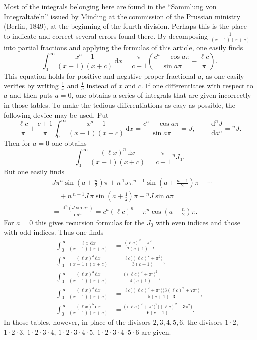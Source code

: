 \documentclass[11pt]{article}
\newcommand{\dd}{\,\mathrm d}
\begin{document}
Most of the integrals belonging here are found in the “Sammlung von Integraltafeln” issued by Minding at the commission of the Prussian ministry (Berlin, 1849), at the beginning of the fourth division. Perhaps this is the place to indicate and correct several errors found there. By decomposing $\frac1{(x-1)(x+c)}$ into partial fractions and applying the formulas of this article, one easily finds
\[
\int_0^\infty\frac{x^a-1}{(x-1)(x+c)}\dd x
=\frac{\pi}{c+1}
\left(\frac{c^a-\cos a\pi}{\sin a\pi}
-\frac{\ell c}{\pi}\right).
\]
This equation holds for positive and negative proper fractional $a$, as one easily verifies by writing $\frac1x$ and $\frac1c$ instead of $x$ and $c$. If one differentiates with respect to $a$ and then puts $a=0$, one obtains a series of integrals that are given incorrectly in those tables. To make the tedious differentiations as easy as possible, the following device may be used. Put
\[
\frac{\ell c}{\pi}+\frac{c+1}{\pi}
\int_0^\infty\frac{x^a-1}{(x-1)(x+c)}\dd x
=\frac{c^a-\cos a\pi}{\sin a\pi}=J,
\qquad
\frac{\dd^nJ}{\dd a^n}={}^{n}J.
\]
Then for $a=0$ one obtains
\[
\int_0^\infty\frac{(\ell x)^n\dd x}{(x-1)(x+c)}
=\frac{\pi}{c+1}\,{}^{n}J_0.
\]
But one easily finds
\[
\begin{aligned}
&J\pi^n\sin\left(a+\frac n2\right)\pi
+n\,{}^{1}J\,\pi^{n-1}\sin\left(a+\frac{n-1}{2}\right)\pi+\cdots\\
&\quad{}+n\,{}^{n-1}J\,\pi\sin\left(a+\frac12\right)\pi
+{}^{n}J\sin a\pi\\
&=\frac{\dd^n(J\sin a\pi)}{\dd a^n}
=c^a(\ell c)^n-\pi^n\cos\left(a+\frac n2\right)\pi.
\end{aligned}
\]
For $a=0$ this gives recursion formulas for the $J_0$ with even indices and those with odd indices. Thus one finds
\[
\begin{aligned}
\int_0^\infty\frac{\ell x\,\dd x}{(x-1)(x+c)}
&=\frac{(\ell c)^2+\pi^2}{2(c+1)},\\
\int_0^\infty\frac{(\ell x)^2\dd x}{(x-1)(x+c)}
&=\frac{\ell c\bigl((\ell c)^2+\pi^2\bigr)}{3(c+1)},\\
\int_0^\infty\frac{(\ell x)^3\dd x}{(x-1)(x+c)}
&=\frac{\bigl((\ell c)^2+\pi^2\bigr)^2}{4(c+1)},\\
\int_0^\infty\frac{(\ell x)^4\dd x}{(x-1)(x+c)}
&=\frac{\ell c\bigl((\ell c)^2+\pi^2\bigr)
        \bigl(3(\ell c)^2+7\pi^2\bigr)}{5(c+1)\cdot3},\\
\int_0^\infty\frac{(\ell x)^5\dd x}{(x-1)(x+c)}
&=\frac{\bigl((\ell c)^2+\pi^2\bigr)^2
        \bigl((\ell c)^2+3\pi^2\bigr)}{6(c+1)}.
\end{aligned}
\]
In those tables, however, in place of the divisors $2,3,4,5,6$, the divisors $1\cdot2$, $1\cdot2\cdot3$, $1\cdot2\cdot3\cdot4$, $1\cdot2\cdot3\cdot4\cdot5$, $1\cdot2\cdot3\cdot4\cdot5\cdot6$ are given.
\end{document}
